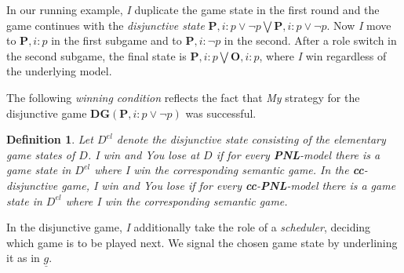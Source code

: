 \documentclass{easychair}
\newcommand{\I}{\emph{I}\xspace}
\newcommand{\You}{\emph{You}\xspace}
\newcommand{\My}{\emph{My}\xspace}
\newtheorem{definition}{Definition}
\newcommand{\PNL}{\textbf{PNL}}
\newcommand{\cc}{\textbf{cc}}
\begin{document}
In our running example, \I duplicate the game state in the first round and the
game continues with the \emph{disjunctive state} $\mathbf{P},i: p \vee \neg
p\bigvee \mathbf{P},i: p \vee \neg p$. Now \I move to $\mathbf{P},i: p$ in the
first subgame and to $\mathbf{P},i:\neg p$ in the second. After a role switch
in the second subgame, the final state is $\mathbf{P},i: p \bigvee
\mathbf{O},i: p$, where \I win regardless of the underlying model.

The following \emph{winning condition} reflects the fact that \My strategy for
the disjunctive game $\mathbf{DG}(\mathbf{P},i:p \vee \neg p)$ was successful.
\begin{definition}\label{def:win}
Let $D^{el}$ denote the disjunctive state consisting of the elementary game
states of $D$. \I win and \You lose at $D$ if for every \PNL-model there is
a game state in $D^{el}$ where \I win the corresponding semantic game. In the \cc-disjunctive game, \I win and \You lose if for every \cc-\PNL-model there is
a game state in $D^{el}$ where \I win the corresponding semantic game.
\end{definition}

In the disjunctive game, \I additionally take the
role of a \emph{scheduler}, deciding which game  is to be played next. We
signal the chosen game state by underlining it as in $\underline{g}$.
 
\end{document}
